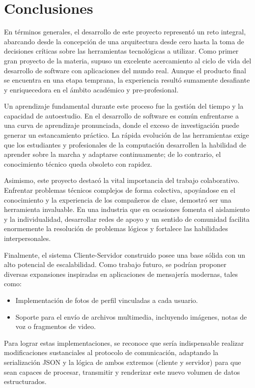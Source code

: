 \section{Conclusiones}

En términos generales, el desarrollo de este proyecto representó un reto integral, abarcando desde la concepción de una arquitectura desde cero hasta la toma de decisiones críticas sobre las herramientas tecnológicas a utilizar. Como primer gran proyecto de la materia, supuso un excelente acercamiento al ciclo de vida del desarrollo de software con aplicaciones del mundo real. Aunque el producto final se encuentra en una etapa temprana, la experiencia resultó sumamente desafiante y enriquecedora en el ámbito académico y pre-profesional.

Un aprendizaje fundamental durante este proceso fue la gestión del tiempo y la capacidad de autoestudio. En el desarrollo de software es común enfrentarse a una curva de aprendizaje pronunciada, donde el exceso de investigación puede generar un estancamiento práctico. La rápida evolución de las herramientas exige que los estudiantes y profesionales de la computación desarrollen la habilidad de aprender sobre la marcha y adaptarse continuamente; de lo contrario, el conocimiento técnico queda obsoleto con rapidez.

Asimismo, este proyecto destacó la vital importancia del trabajo colaborativo. Enfrentar problemas técnicos complejos de forma colectiva, apoyándose en el conocimiento y la experiencia de los compañeros de clase, demostró ser una herramienta invaluable. En una industria que en ocasiones fomenta el aislamiento y la individualidad, desarrollar redes de apoyo y un sentido de comunidad facilita enormemente la resolución de problemas lógicos y fortalece las habilidades interpersonales.

Finalmente, el sistema Cliente-Servidor construido posee una base sólida con un alto potencial de escalabilidad. Como trabajo futuro, se podrían proponer diversas expansiones inspiradas en aplicaciones de mensajería modernas, tales como:

\begin{itemize}
    \item Implementación de fotos de perfil vinculadas a cada usuario.
    \item Soporte para el envío de archivos multimedia, incluyendo imágenes, notas de voz o fragmentos de video.
\end{itemize}

Para lograr estas implementaciones, se reconoce que sería indispensable realizar modificaciones sustanciales al protocolo de comunicación, adaptando la serialización JSON y la lógica de ambos extremos (cliente y servidor) para que sean capaces de procesar, transmitir y renderizar este nuevo volumen de datos estructurados.